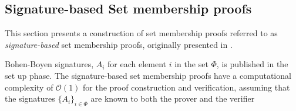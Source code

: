 

\subsection*{Signature-based  Set membership proofs}

This section presents a construction of set membership proofs referred to as \textit{signature-based} set membership proofs, originally presented in \cite{RANGE-SET}. 

 Bohen-Boyen signatures, $A_i$ for each element  $i$ in the set $\Phi$, is published in the set up phase. The signature-based set membership proofs have a computational complexity of $\mathcal{O}(1)$ for the proof construction and verification, assuming that the signatures $\{A_i\}_{i\in\Phi}$ are known to both the prover and the verifier 


